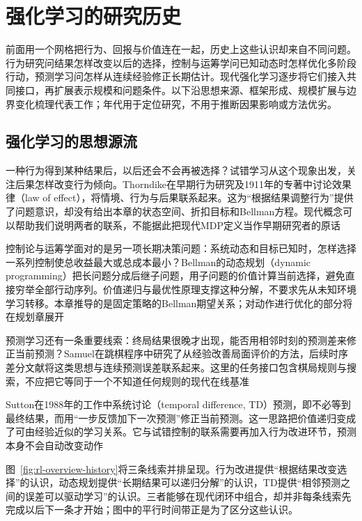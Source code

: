 \section{强化学习的研究历史}
\label{sec:rl-overview-history}

前面用一个网格把行为、回报与价值连在一起，历史上这些认识却来自不同问题。行为研究问结果怎样改变以后的选择，控制与运筹学问已知动态时怎样优化多阶段行动，预测学习问怎样从连续经验修正长期估计。现代强化学习逐步将它们接入共同接口，再扩展表示规模和问题条件。以下沿思想来源、框架形成、规模扩展与边界变化梳理代表工作；年代用于定位研究，不用于推断因果影响或方法优劣。

\subsection{强化学习的思想源流}
\label{sec:rl-overview-origins}

一种行为得到某种结果后，以后还会不会再被选择？试错学习从这个现象出发，关注后果怎样改变行为倾向。Thorndike在早期行为研究及1911年的专著中讨论效果律（law of effect），将情境、行为与后果联系起来。这为“根据结果调整行为”提供了问题意识，却没有给出本章的状态空间、折扣目标和Bellman方程。现代概念可以帮助我们说明两者的联系，不能据此把现代MDP定义当作早期研究者的原话

控制论与运筹学面对的是另一项长期决策问题：系统动态和目标已知时，怎样选择一系列控制使总收益最大或总成本最小？Bellman的动态规划（dynamic programming）把长问题分成后继子问题，用子问题的价值计算当前选择，避免直接穷举全部行动序列。价值递归与最优性原理支撑这种分解，不要求先从未知环境学习转移。本章推导的是固定策略的Bellman期望关系；对动作进行优化的部分将在规划章展开

预测学习还有一条重要线索：终局结果很晚才出现，能否用相邻时刻的预测差来修正当前预测？Samuel在跳棋程序中研究了从经验改善局面评价的方法，后续时序差分文献将这类思想与连续预测误差联系起来。这里的任务接口包含棋局规则与搜索，不应把它等同于一个不知道任何规则的现代在线基准

Sutton在1988年的工作中系统讨论（temporal difference, TD）预测，即不必等到最终结果，而用“一步反馈加下一次预测”修正当前预测。这一思路把价值递归变成了可由经验近似的学习关系。它与试错控制的联系需要再加入行为改进环节，预测本身不会自动改变动作

图~\ref{fig:rl-overview-history}将三条线索并排呈现。行为改进提供“根据结果改变选择”的认识，动态规划提供“长期结果可以递归分解”的认识，TD提供“相邻预测之间的误差可以驱动学习”的认识。三者能够在现代闭环中组合，却并非每条线索先完成以后下一条才开始；图中的平行时间带正是为了区分这些认识。

